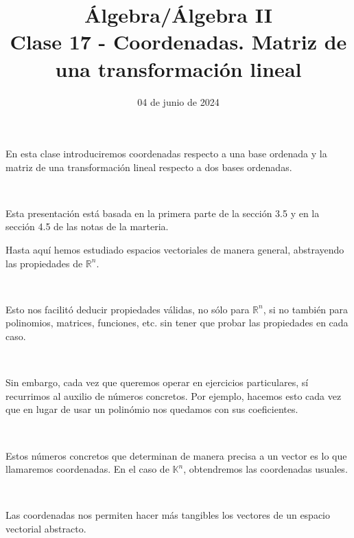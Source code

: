 \documentclass[handout]{beamer} %
\title[Clase 17 - Coordenadas. Matriz de una transformación lineal]{Álgebra/Álgebra II \\ Clase 17 - Coordenadas. Matriz de una transformación lineal}
\author[]{}
\institute[]{\normalsize FAMAF / UNC
	\\[\baselineskip] ${}^{}$
	\\[\baselineskip]
}
\date[04/06/2024]{04 de junio de 2024}
\newcommand{\R}{\mathbb R}
\newcommand{\K}{\mathbb K}
\begin{document}
\begin{frame}
\maketitle
\end{frame}



\begin{frame}

    En esta clase introduciremos coordenadas respecto a una base ordenada y la matriz de una transformación lineal respecto a dos bases ordenadas.\pause
    
    \
    
    Esta presentación está basada  en la primera parte de la sección 3.5 y en la sección 4.5 de las notas de la marteria.\pause
    \
    
    \end{frame}
    
    
        \begin{frame}
        
        Hasta aquí hemos estudiado espacios vectoriales de manera general, abstrayendo las propiedades de $\R^n$.\pause
        
        \
        
        Esto nos facilitó deducir propiedades válidas, no sólo para $\R^n$, si no también para polinomios, matrices, funciones, etc. sin tener que probar las propiedades en cada caso.\pause
        
        \
        
        Sin embargo, cada vez que queremos operar en ejercicios particulares, sí recurrimos al auxilio de números concretos. Por ejemplo, hacemos esto cada vez que en lugar de usar un polinómio nos quedamos con sus coeficientes.\pause
        
        \
        
        Estos números concretos que determinan de manera precisa a un vector es lo que llamaremos coordenadas. En el caso de $\K^n$, obtendremos las coordenadas usuales.\pause
        
        \
        
        Las coordenadas nos permiten hacer más tangibles los vectores de un espacio vectorial abstracto.
        \end{frame}
        
\end{document}
